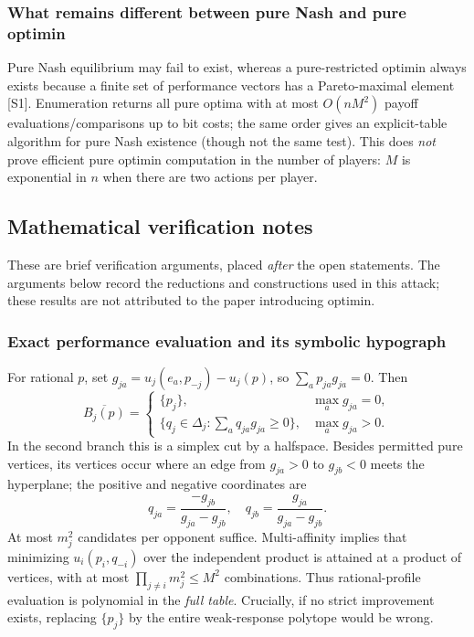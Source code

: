 \documentclass[11pt,a4paper]{article}
\providecommand{\D}{\Delta}
\begin{document}
\subsubsection*{What remains different between pure Nash and pure optimin}
Pure Nash equilibrium may fail to exist, whereas a pure-restricted optimin always exists because a finite set of performance vectors has a Pareto-maximal element [S1]. Enumeration returns all pure optima with at most $O(nM^2)$ payoff evaluations/comparisons up to bit costs; the same order gives an explicit-table algorithm for pure Nash existence (though not the same test). This does \emph{not} prove efficient pure optimin computation in the number of players: $M$ is exponential in $n$ when there are two actions per player.

\subsection*{Mathematical verification notes}\label{optimin:sec:checks}
These are brief verification arguments, placed \emph{after} the open statements. The arguments below record the reductions and constructions used in this attack; these results are not attributed to the paper introducing optimin.

\subsubsection*{Exact performance evaluation and its symbolic hypograph}
For rational $p$, set $g_{ja}=u_j(e_a,p_{-j})-u_j(p)$, so $\sum_a p_{ja}g_{ja}=0$. Then
\[
 \overline{B_j(p)}=
 \begin{cases}
 \{p_j\},&\max_a g_{ja}=0,\\
 \{q_j\in\D_j:\sum_a q_{ja}g_{ja}\ge0\},&\max_a g_{ja}>0.
 \end{cases}
\tag{OPT.9}
\]
In the second branch this is a simplex cut by a halfspace. Besides permitted pure vertices, its vertices occur where an edge from $g_{ja}>0$ to $g_{jb}<0$ meets the hyperplane; the positive and negative coordinates are
\[
 q_{ja}=\frac{-g_{jb}}{g_{ja}-g_{jb}},\quad
 q_{jb}=\frac{g_{ja}}{g_{ja}-g_{jb}}.
\tag{OPT.10}
\]
At most $m_j^2$ candidates per opponent suffice. Multi-affinity implies that minimizing $u_i(p_i,q_{-i})$ over the independent product is attained at a product of vertices, with at most $\prod_{j\ne i}m_j^2\le M^2$ combinations. Thus rational-profile evaluation is polynomial in the \emph{full table}. Crucially, if no strict improvement exists, replacing $\{p_j\}$ by the entire weak-response polytope would be wrong.
\end{document}
